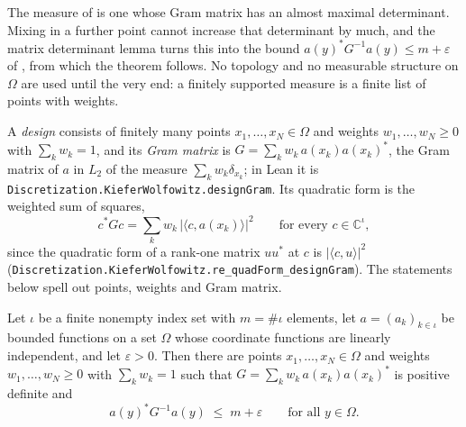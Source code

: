 The measure of  is one whose Gram matrix has an almost
maximal determinant. Mixing in a further point cannot increase that determinant by much,
and the matrix determinant lemma turns this into the bound $a(y)^* G^{-1} a(y) \leq m +
\varepsilon$ of , from which the theorem follows. No
topology and no measurable structure on $\Omega$ are used until the very end: a finitely
supported measure is a finite list of points with weights.

A \emph{design} consists of finitely many points $x_1, \dots, x_N \in \Omega$ and weights
$w_1, \dots, w_N \geq 0$ with $\sum_k w_k = 1$, and its \emph{Gram matrix} is
$G = \sum_k w_k \, a(x_k) a(x_k)^*$, the Gram matrix of $a$ in $L_2$ of the measure
$\sum_k w_k \delta_{x_k}$; in Lean it is
\texttt{Discretization.KieferWolfowitz.designGram}. Its quadratic form is the weighted sum
of squares,
\[
  c^* G c = \sum_k w_k \, |\langle c, a(x_k) \rangle|^2
  \qquad \text{for every } c \in \mathbb{C}^{\iota},
\]
since the quadratic form of a rank-one matrix $u u^*$ at $c$ is $|\langle c, u \rangle|^2$
(\texttt{Discretization.KieferWolfowitz.re\_quadForm\_designGram}). The statements below
spell out points, weights and Gram matrix.

\begin{proposition}
\label{prop:almost-maximal-determinant}
\leanok
Let $\iota$ be a finite nonempty index set with $m = \#\iota$ elements, let
$a = (a_k)_{k \in \iota}$ be bounded functions on a set $\Omega$ whose coordinate functions
are linearly independent, and let $\varepsilon > 0$. Then there are points
$x_1, \dots, x_N \in \Omega$ and weights $w_1, \dots, w_N \geq 0$ with $\sum_k w_k = 1$ such
that $G = \sum_k w_k \, a(x_k) a(x_k)^*$ is positive definite and
\[
  a(y)^* G^{-1} a(y) \; \leq \; m + \varepsilon \qquad \text{for all } y \in \Omega .
\]
\end{proposition}

